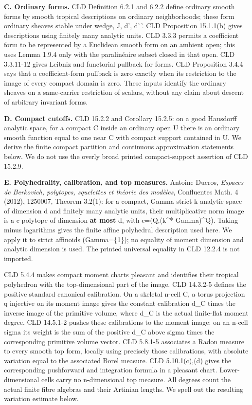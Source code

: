 \documentclass[
  10pt,
]{article}
\begin{document}
\textbf{C. Ordinary forms.} CLD Definition 6.2.1 and 6.2.2 define
ordinary smooth forms by smooth tropical descriptions on ordinary
neighborhoods; these form ordinary sheaves stable under wedge, J, d',
d'\,'. CLD Proposition 15.1.1(b) gives descriptions using finitely many
analytic units. CLD 3.3.3 permits a coefficient form to be represented
by a Euclidean smooth form on an ambient open; this uses Lemma 1.9.4
only with the paralinéaire subset closed in that open. CLD 3.3.11-12
gives Leibniz and functorial pullback for forms. CLD Proposition 3.4.4
says that a coefficient-form pullback is zero exactly when its
restriction to the image of every compact domain is zero. These inputs
identify the ordinary sheaves on a same-carrier restriction of scalars,
without any claim about descent of arbitrary invariant forms.

\textbf{D. Compact cutoffs.} CLD 15.2.2 and Corollary 15.2.5: on a good
Hausdorff analytic space, for a compact C inside an ordinary open U
there is an ordinary smooth function equal to one near C with compact
support contained in U. We derive the finite compact partition and
continuous approximation statements below. We do not use the overly
broad printed compact-support assertion of CLD 15.2.9.

\textbf{E. Polyhedrality, calibration, and top measures.} Antoine
Ducros, \emph{Espaces de Berkovich, polytopes, squelettes et théorie des
modèles}, Confluentes Math. 4 (2012), 1250007, Theorem 3.2(1): for a
compact, Gamma-strict k-analytic space of dimension d and finitely many
analytic units, their multiplicative norm image is a c-polytope of
dimension \textbf{at most} d, with c=(Q,(\textbar k\^{}*\textbar{}
Gamma)\^{}Q). Taking minus logarithms gives the finite affine polyhedral
description used here. We apply it to strict affinoids (Gamma=\{1\}); no
equality of moment dimension and analytic dimension is used. The printed
universal equality in CLD 12.2.4 is not imported.

CLD 5.4.4 makes compact moment charts pleasant and identifies their
tropical polyhedron with the top-dimensional part of the image. CLD
14.3.2-5 defines the positive standard canonical calibration. On a
skeletal n-cell C, a torus projection q injective on its moment image
gives the constant calibration d\_C times the inverse image of the
primitive volume, where d\_C is the actual finite-flat moment degree.
CLD 14.5.1-2 pushes these calibrations to the moment image: on an n-cell
sigma its weight is the sum of the positive d\_C above sigma times the
corresponding primitive volume vector. CLD 5.8.1-5 associates a Radon
measure to every smooth top form, locally using precisely those
calibrations, with absolute variation equal to the associated Borel
measure. CLD 5.10.1(c),(d) gives the corresponding pushforward and
integration formula in a pleasant chart. Lower-dimensional cells carry
no n-dimensional top measure. All degrees count the actual finite fibre
algebras and their Artinian lengths. We spell out the resulting
variation estimate below.
\end{document}
